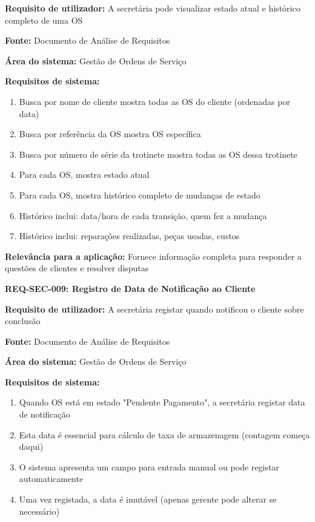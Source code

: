 \documentclass[11pt,a4paper]{article}
\newcommand{\reqheader}[1]{{\noindent\large\bfseries\color{sectionblue}#1}\par\vspace{0.3cm}}
\newcommand{\reqfield}[2]{{\noindent\textbf{#1:} #2}\par\vspace{0.2cm}}
\begin{document}
\reqfield{Requisito de utilizador}{A secretária pode visualizar estado atual e histórico completo de uma OS}

\reqfield{Fonte}{Documento de Análise de Requisitos}

\reqfield{Área do sistema}{Gestão de Ordens de Serviço}

\reqfield{Requisitos de sistema}{
	\begin{enumerate}
		\item Busca por nome de cliente mostra todas as OS do cliente (ordenadas por data)
		\item Busca por referência da OS mostra OS específica
		\item Busca por número de série da trotinete mostra todas as OS dessa trotinete
		\item Para cada OS, mostra estado atual
		\item Para cada OS, mostra histórico completo de mudanças de estado
		\item Histórico inclui: data/hora de cada transição, quem fez a mudança
		\item Histórico inclui: reparações realizadas, peças usadas, custos
	\end{enumerate}
}

\reqfield{Relevância para a aplicação}{Fornece informação completa para responder a questões de clientes e resolver disputas}

\vspace{0.8cm}

\reqheader{REQ-SEC-009: Registro de Data de Notificação ao Cliente}

\reqfield{Requisito de utilizador}{A secretária registar quando notificou o cliente sobre conclusão}

\reqfield{Fonte}{Documento de Análise de Requisitos}

\reqfield{Área do sistema}{Gestão de Ordens de Serviço}

\reqfield{Requisitos de sistema}{
	\begin{enumerate}
		\item Quando OS está em estado "Pendente Pagamento", a secretária registar data de notificação
		\item Esta data é essencial para cálculo de taxa de armazenagem (contagem começa daqui)
		\item O sistema apresenta um campo para entrada manual ou pode registar automaticamente
		\item Uma vez registada, a data é imutável (apenas gerente pode alterar se necessário)
	\end{enumerate}
}
\end{document}
